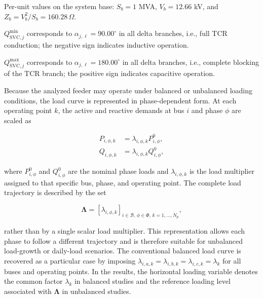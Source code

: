 \documentclass[journal]{IEEEtran}
\begin{document}
\begin{table}[htbp]
\begin{threeparttable}
\begin{tablenotes}
\scriptsize
\item[a] Per-unit values on the system base: $S_b=1$ MVA, $V_b=12.66$ kV, and $Z_b=V_b^2/S_b=160.28\,\Omega$.
\item[b] $Q_{\mathrm{SVC},j}^{\min}$ corresponds to $\alpha_{j,\ell}=90.00^\circ$ in all delta branches, i.e., full TCR conduction; the negative sign indicates inductive operation.
\item[c] $Q_{\mathrm{SVC},j}^{\max}$ corresponds to $\alpha_{j,\ell}=180.00^\circ$ in all delta branches, i.e., complete blocking of the TCR branch; the positive sign indicates capacitive operation.
\end{tablenotes}
\end{threeparttable}
\end{table}






Because the analyzed feeder may operate under balanced or unbalanced loading
conditions, the load curve is represented in phase-dependent form. At each
operating point $k$, the active and reactive demands at bus $i$ and phase
$\phi$ are scaled as\vspace{-1em}

\begin{align}
    P_{i,\phi,k} &= \lambda_{i,\phi,k} P_{i,\phi}^{0}, \\
    Q_{i,\phi,k} &= \lambda_{i,\phi,k} Q_{i,\phi}^{0},
    \label{eq:phase_load_scaling}
\end{align}

\noindent where $P_{i,\phi}^{0}$ and $Q_{i,\phi}^{0}$ are the nominal phase
loads and $\lambda_{i,\phi,k}$ is the load multiplier assigned to that
specific bus, phase, and operating point. The complete load trajectory is described by the set\vspace{-1em}

\begin{equation}
    \boldsymbol{\Lambda} =
    \left[\lambda_{i,\phi,k}\right]_{i\in\mathcal{B},\,\phi\in\Phi,\,k=1,\ldots,N_p},
    \label{eq:phase_load_curve}
\end{equation}

\noindent rather than by a single scalar load multiplier. This representation
allows each phase to follow a different trajectory and is therefore suitable
for unbalanced load-growth or daily-load scenarios. The conventional balanced
load curve is recovered as a particular case by imposing
$\lambda_{i,a,k}=\lambda_{i,b,k}=\lambda_{i,c,k}=\lambda_k$ for all buses
and operating points. In the results, the horizontal loading variable denotes
the common factor $\lambda_k$ in balanced studies and the reference loading
level associated with $\boldsymbol{\Lambda}$ in unbalanced studies.
\end{document}
